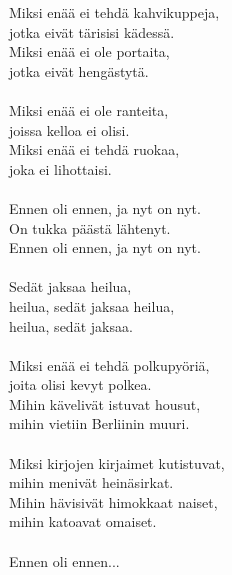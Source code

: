 
        Miksi enää ei tehdä kahvikuppeja, \\
        jotka eivät tärisisi kädessä. \\
        Miksi enää ei ole portaita, \\
        jotka eivät hengästytä. \\
\hspace{10mm} \\
        Miksi enää ei ole ranteita, \\
        joissa kelloa ei olisi. \\
        Miksi enää ei tehdä ruokaa, \\
        joka ei lihottaisi. \\
\hspace{10mm} \\
        Ennen oli ennen, ja nyt on nyt. \\
        On tukka päästä lähtenyt. \\
        Ennen oli ennen, ja nyt on nyt. \\
\hspace{10mm} \\
        Sedät jaksaa heilua, \\
        heilua, sedät jaksaa heilua, \\
        heilua, sedät jaksaa. \\
\hspace{10mm} \\
        Miksi enää ei tehdä polkupyöriä, \\
        joita olisi kevyt polkea. \\
        Mihin kävelivät istuvat housut, \\
        mihin vietiin Berliinin muuri. \\
\hspace{10mm} \\
        Miksi kirjojen kirjaimet kutistuvat, \\
        mihin menivät heinäsirkat. \\
        Mihin hävisivät himokkaat naiset, \\
        mihin katoavat omaiset. \\
\hspace{10mm} \\
        Ennen oli ennen... \\
